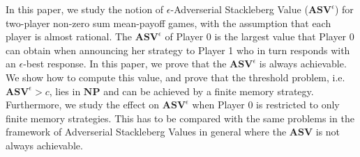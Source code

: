 In this paper, we study the notion of $\epsilon$-Adverserial Stackleberg Value ($\mathbf{ASV}^{\epsilon}$) for two-player non-zero sum mean-payoff games, with the assumption that each player is almost rational. The $\mathbf{ASV}^{\epsilon}$ of Player 0 is the largest value that Player 0 can obtain when announcing her strategy to Player 1 who in turn responds with an $\epsilon$-best response. In this paper, we prove that the $\mathbf{ASV}^{\epsilon}$ is always achievable. We show how to compute this value, and prove that the threshold problem, i.e. $\mathbf{ASV}^{\epsilon} > c$, lies in $\textbf{NP}$ and can be achieved by a finite memory strategy. Furthermore, we study the effect on $\mathbf{ASV}^{\epsilon}$ when Player 0 is restricted to only finite memory strategies. This has to be compared with the same problems in the framework of Adverserial Stackleberg Values in general where the $\mathbf{ASV}$ is not always achievable.